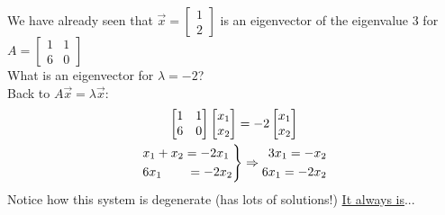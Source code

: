 We have already seen that $\vec{x} = \begin{bmatrix} 1\\ 2\end{bmatrix}$ is an eigenvector of the eigenvalue 3 for $A = \begin{bmatrix} 1 & 1\\ 6 & 0 \end{bmatrix}$\\
What is an eigenvector for $\lambda = -2$?\\
Back to $A\vec{x} = \lambda \vec{x}$:
\begin{gather*}
	\begin{bmatrix}
		1 & 1\\ 6 & 0
	\end{bmatrix}
	\begin{bmatrix}
		x_1\\x_2
	\end{bmatrix} = -2
	\begin{bmatrix}
		x_1\\x_2
	\end{bmatrix}\\
	\begin{split}
		\begin{rcases}
			x_1 + x_2 = -2 x_1\\
			6x_1 \quad \quad = -2x_2
		\end{rcases}
	\end{split} \Rightarrow
	\begin{split}
		3x_1 = -x_2\\
		6x_1 = -2x_2
	\end{split} 
\end{gather*}
Notice how this system is degenerate (has lots of solutions!) \underline{It always is}...\\
